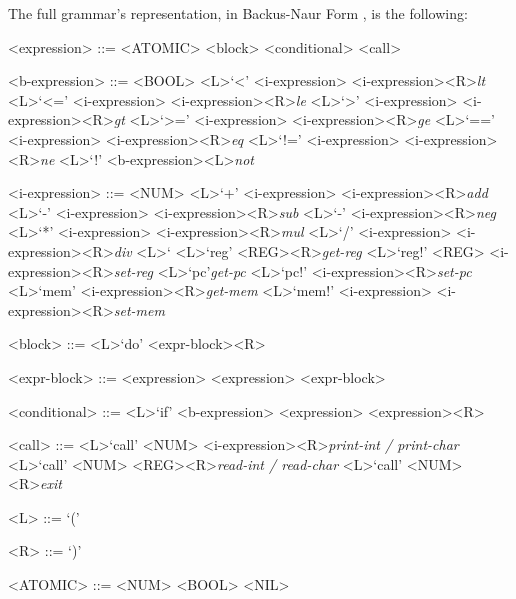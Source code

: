 \noindent
The full grammar's representation, in Backus-Naur Form \parencite{Backus1963Rev}, is the following:
%
\begin{tcolorbox}[enhanced jigsaw,breakable,top=4mm]
  \begin{grammar}
    <expression> ::= <ATOMIC>
      \alt <block>
      \alt <conditional>
      \alt <call>

    <b-expression> ::= <BOOL>
      \alt <L>`<' <i-expression> <i-expression><R>\hfill\textit{lt}
      \alt <L>`<=' <i-expression> <i-expression><R>\hfill\textit{le}
      \alt <L>`>' <i-expression> <i-expression><R>\hfill\textit{gt}
      \alt <L>`>=' <i-expression> <i-expression><R>\hfill\textit{ge}
      \alt <L>`==' <i-expression> <i-expression><R>\hfill\textit{eq}
      \alt <L>`!=' <i-expression> <i-expression><R>\hfill\textit{ne}
      \alt <L>`!' <b-expression><L>\hfill\textit{not}

    <i-expression> ::= <NUM>
      \alt <L>`+' <i-expression> <i-expression><R>\hfill\textit{add}
      \alt <L>`-' <i-expression> <i-expression><R>\hfill\textit{sub}
      \alt <L>`-' <i-expression><R>\hfill\textit{neg}
      \alt <L>`*' <i-expression> <i-expression><R>\hfill\textit{mul}
      \alt <L>`/' <i-expression> <i-expression><R>\hfill\textit{div}
      \alt <L>`%
      \alt <L>`reg' <REG><R>\hfill\textit{get-reg}
      \alt <L>`reg!' <REG> <i-expression><R>\hfill\textit{set-reg}
      \alt <L>`pc'\hfill\textit{get-pc}
      \alt <L>`pc!' <i-expression><R>\hfill\textit{set-pc}
      \alt <L>`mem' <i-expression><R>\hfill\textit{get-mem}
      \alt <L>`mem!' <i-expression> <i-expression><R>\hfill\textit{set-mem}

    <block> ::= <L>`do' <expr-block><R>

    <expr-block> ::= <expression>
      \alt <expression> <expr-block>

    <conditional> ::= <L>`if' <b-expression> <expression> <expression><R>

    <call> ::= <L>`call' <NUM> <i-expression><R>\hfill\textit{print-int / print-char}
      \alt <L>`call' <NUM> <REG><R>\hfill\textit{read-int / read-char}
      \alt <L>`call' <NUM><R>\hfill\textit{exit}

    <L> ::= `('

    <R> ::= `)'

    <ATOMIC> ::= <NUM>
      \alt <BOOL>
      \alt <NIL>


\end{grammar}
\end{tcolorbox}
